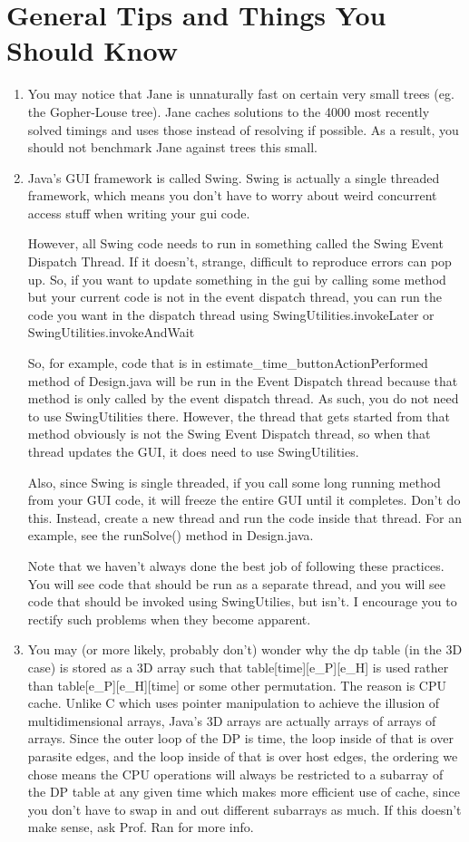 \documentclass{article}
\begin{document}
\section{General Tips and Things You Should Know}
\begin{enumerate}
\item You may notice that Jane is unnaturally fast on certain very small trees (eg. the Gopher-Louse tree). Jane caches solutions to the 4000 most recently solved timings and uses those instead of resolving if possible. As a result, you should not benchmark Jane against trees this small.

\item Java's GUI framework is called Swing. Swing is actually a single threaded framework, which means you don't have to worry about weird concurrent access stuff when writing your gui code.

However, all Swing code needs to run in something called the Swing Event Dispatch Thread. If it doesn't, strange, difficult to reproduce errors can pop up. So, if you want to update something in the gui by calling some method but your current code is not in the event dispatch thread, you can run the code you want in the dispatch thread using SwingUtilities.invokeLater or SwingUtilities.invokeAndWait

So, for example, code that is in estimate\_time\_buttonActionPerformed method of Design.java will be run in the Event Dispatch thread because that method is only called by the event dispatch thread. As such, you do not need to use SwingUtilities there. However, the thread that gets started from that method obviously is not the Swing Event Dispatch thread, so when that thread updates the GUI, it does need to use SwingUtilities.

Also, since Swing is single threaded, if you call some long running method from your GUI code, it will freeze the entire GUI until it completes. Don't do this. Instead, create a new thread and run the code inside that thread. For an example, see the runSolve() method in Design.java.

Note that we haven't always done the best job of following these practices. You will see code that should be run as a separate thread, and you will see code that should be invoked using SwingUtilies, but isn't. I encourage you to rectify such problems when they become apparent.

\item You may (or more likely, probably don't) wonder why the dp table (in the 3D case) is stored as a 3D array such that
table[time][e\_P][e\_H] is used rather than table[e\_P][e\_H][time] or some other permutation. The reason is CPU cache. Unlike C which uses pointer manipulation to achieve the illusion of multidimensional arrays, Java's 3D arrays are actually arrays of arrays of arrays. Since the outer loop of the DP is time, the loop inside of that is over parasite edges, and the loop inside of that is over host edges, the ordering we chose means the CPU operations will always be restricted to a subarray of the DP table at any given time which makes more efficient use of cache, since you don't have to swap in and out different subarrays as much. If this doesn't make sense, ask Prof. Ran for more info.


\end{enumerate}
\end{document}
